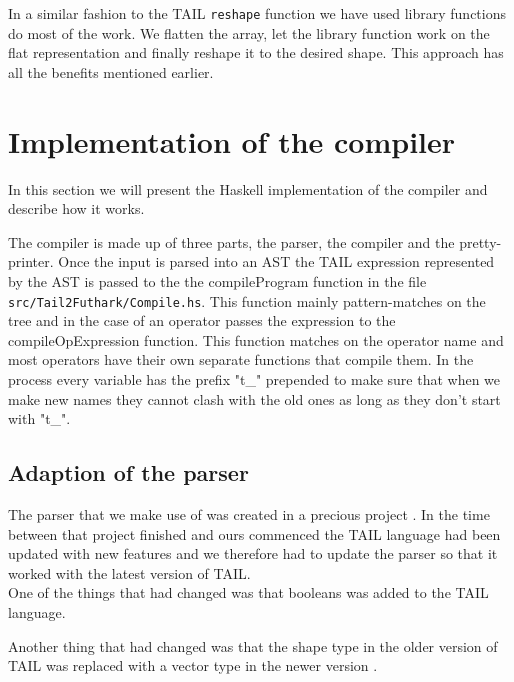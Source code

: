 \documentclass[11pt]{article}
\begin{document}
In a similar fashion to the TAIL {\tt reshape} function we have used library functions do most of the work.
We flatten the array, let the library function work on the flat representation and finally reshape it to the desired shape.
This approach has all the benefits mentioned earlier.

\section{Implementation of the compiler}

In this section we will present the Haskell implementation of the compiler and describe how it works.

The compiler is made up of three parts, the parser, the compiler and the pretty-printer. Once the input is parsed into an AST the
TAIL expression represented by the AST is passed to the the compileProgram function in the file \\
{\tt src/Tail2Futhark/Compile.hs}.
This function mainly pattern-matches on the tree and in the case of an operator passes the expression to the compileOpExpression
function.
This function matches on the operator name and most operators have their own separate functions that compile them.
In the process every variable has the prefix "t\_" prepended to make sure that when we make new names they cannot clash
with the old ones as long as they don't start with "t\_".

\subsection{Adaption of the parser}

The parser that we make use of was created in a precious project \cite{APLACC}.
In the time between that project finished and ours commenced the TAIL language
had been updated with new features and we therefore had to update the parser so that it worked with the latest version of TAIL.\\

One of the things that had changed was that booleans was added to the TAIL language. %

Another thing that had changed was that the shape type in the older version of TAIL was replaced with a vector type in the newer version \cite{ElsmanDybdal:Array:2014}.\\
\end{document}
